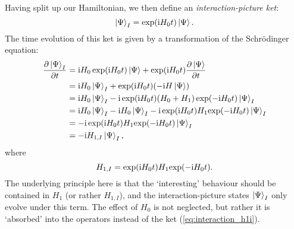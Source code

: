 Having split up our Hamiltonian, we then define an \textit{interaction-picture ket}:
\begin{equation}
    \label{eq:interaction_state}
    \ket{\Psi}_I = \exp(\mathrm{i} H_0 t)\ket{\Psi}.
\end{equation}
The time evolution of this ket is given by a transformation of the Schr\"odinger equation:
\begin{align}
    \label{eq:interaction_evolution}
    \frac{\partial\ket{\Psi}_I}{\partial t} &= \mathrm{i} H_0 \exp(\mathrm{i} H_0 t) \ket{\Psi} + \exp(\mathrm{i} H_0 t)\frac{\partial \ket{\Psi}}{\partial t} \notag \\
                                            &= \mathrm{i} H_0 \ket{\Psi}_I + \exp(\mathrm{i} H_0 t) (-\mathrm{i} H\ket{\Psi}) \notag \\
                                            &= \mathrm{i} H_0 \ket{\Psi}_I - \mathrm{i}\exp(\mathrm{i} H_0t)(H_0 + H_1)\exp(-\mathrm{i} H_0 t)\ket{\Psi}_I \notag \\
                                            &= \mathrm{i} H_0 \ket{\Psi}_I - \mathrm{i} H_0\ket{\Psi}_I - \mathrm{i}\exp(\mathrm{i} H_0t)H_1\!\exp(-\mathrm{i} H_0 t)\ket{\Psi}_I \notag \\
                                            &= -\mathrm{i}\exp(\mathrm{i} H_0 t)H_1\!\exp(-\mathrm{i} H_0 t)\ket{\Psi}_I \notag \\
                                            &= -\mathrm{i} H_{1,I}\ket{\Psi}_I,
\end{align}
where
\begin{equation}
    \label{eq:interaction_h1i}
    H_{1,I} = \exp(\mathrm{i} H_0 t) H_1 \!\exp(-\mathrm{i} H_0 t).
\end{equation}
The underlying principle here is that the `interesting' behaviour should be contained in $H_1$ (or rather $H_{1,I}$), and the interaction-picture states $\ket{\Psi}_I$ only evolve under this term.
The effect of $H_0$ is not neglected, but rather it is `absorbed' into the operators instead of the ket (\cref{eq:interaction_h1i}).

